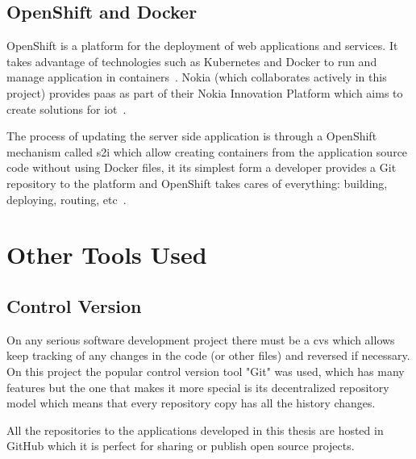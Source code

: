 \documentclass[hidelinks,11pt,a4paper,oneside,article]{memoir}
\newcommand{\putimage}[3][10] %
{
\begin{figure}[h]
	\centering
	\captionsetup{justification=centering}
	\texttt{[image: \#2]}
	\caption{#3}
	\label{fig:#2}
\end{figure}
}
\begin{document}
\subsection*{OpenShift and Docker}
OpenShift is a platform for the deployment of web applications and services. It takes advantage of technologies such as Kubernetes and Docker to run and manage application in containers~\cite{shipley2016openshift}. Nokia (which collaborates actively in this project) provides \gls{paas} as part of their Nokia Innovation Platform which aims to create solutions for \gls{iot}~\cite{nokiainnovation}.

The process of updating the server side application is through a OpenShift mechanism called \gls{s2i} which allow creating containers from the application source code without using Docker files, it its simplest form a developer provides a Git repository to the platform and OpenShift takes cares of everything: building, deploying, routing, etc~\cite[5]{shipley2016openshift}.



\section{Other Tools Used}

\subsection{Control Version}
On any serious software development project there must be a \gls{cvs} which allows keep tracking of any changes in the code (or other files) and reversed if necessary. On this project the popular control version tool "Git" was used, which has many features but the one that makes it more special is its decentralized repository model which means that every repository copy has all the history changes.

All the repositories to the applications developed in this thesis are hosted in GitHub which it is perfect for sharing or publish open source projects.
\end{document}
